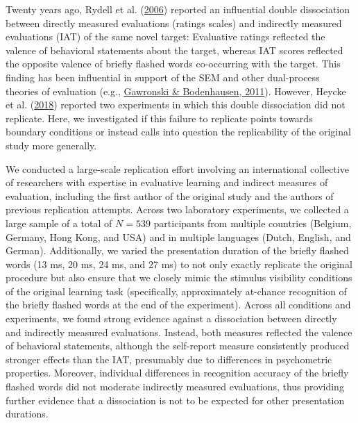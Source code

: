 \documentclass[
  man,floatsintext]{apa6}
\begin{document}
Twenty years ago, Rydell et al. (\protect\hyperlink{ref-rydell_two_2006}{2006}) reported an influential double dissociation between directly measured evaluations (ratings scales) and indirectly measured evaluations (IAT) of the same novel target: Evaluative ratings reflected the valence of behavioral statements about the target, whereas IAT scores reflected the opposite valence of briefly flashed words co-occurring with the target.
This finding has been influential in support of the SEM and other dual-process theories of evaluation (e.g., \protect\hyperlink{ref-gawronskiAssociativePropositionalEvaluation2011}{Gawronski \& Bodenhausen, 2011}).
However, Heycke et al. (\protect\hyperlink{ref-heycke_two_2018}{2018}) reported two experiments in which this double dissociation did not replicate.
Here, we investigated if this failure to replicate points towards boundary conditions or instead calls into question the replicability of the original study more generally.

We conducted a large-scale replication effort involving an international collective of researchers with expertise in evaluative learning and indirect measures of evaluation, including the first author of the original study and the authors of previous replication attempts.
Across two laboratory experiments, we collected a large sample of a total of \(N = 539\) participants from multiple countries (Belgium, Germany, Hong Kong, and USA) and in multiple languages (Dutch, English, and German).
Additionally, we varied the presentation duration of the briefly flashed words (13 ms, 20 ms, 24 ms, and 27 ms) to not only exactly replicate the original procedure but also ensure that we closely mimic the stimulus visibility conditions of the original learning task (specifically, approximately at-chance recognition of the briefly flashed words at the end of the experiment).
Across all conditions and experiments, we found strong evidence against a dissociation between directly and indirectly measured evaluations.
Instead, both measures reflected the valence of behavioral statements, although the self-report measure consistently produced stronger effects than the IAT, presumably due to differences in psychometric properties.
Moreover, individual differences in recognition accuracy of the briefly flashed words did not moderate indirectly measured evaluations, thus providing further evidence that a dissociation is not to be expected for other presentation durations.
\end{document}
